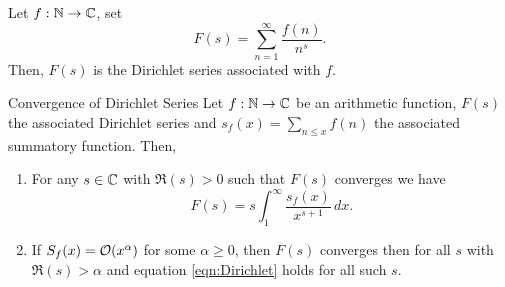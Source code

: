 \documentclass[twoside, openright, fontsize=10pt, headings=big]{scrbook}
\begin{document}
Let $f:\mathbb{N}\to\mathbb{C}$, set 
\[
    F(s)=\sum_{n=1}^{\infty}\frac{f(n)}{n^s}.
\]
Then, $F(s)$ is the Dirichlet series associated with $f$.
\begin{theorem}{Convergence of Dirichlet Series}{}
    Let $f:\mathbb{N}\to\mathbb{C}$ be an arithmetic function, $F(s)$ the associated Dirichlet series and $s_f(x)=\sum_{n\leq x}f(n)$ the associated summatory function. Then,
    \begin{enumerate}[label=(\roman*)]
        \item For any $s\in\mathbb{C}$ with $\Re(s)>0$ such that $F(s)$ converges we have
        \begin{equation}\label{eqn:Dirichlet}
            F(s)=s\int_{1}^{\infty}\frac{s_f(x)}{x^{s+1}}\,dx.
        \end{equation}
        \item If $S_f(x)=\mathcal{O}(x^\alpha)$ for some $\alpha\geq0$, then $F(s)$ converges then for all $s$ with $\Re(s)>\alpha$ and equation \ref{eqn:Dirichlet} holds for all such $s$.
    \end{enumerate}
\end{theorem}
\end{document}
